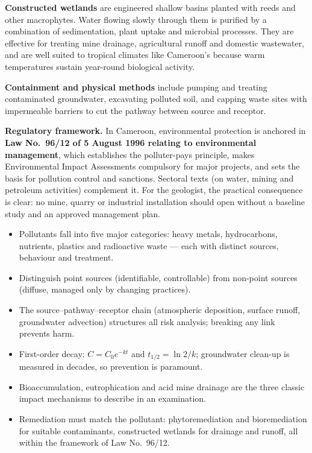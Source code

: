 \documentclass[11pt]{article}
\begin{document}
\textbf{Constructed wetlands} are engineered shallow basins planted with reeds and other macrophytes. Water flowing slowly through them is purified by a combination of sedimentation, plant uptake and microbial processes. They are effective for treating mine drainage, agricultural runoff and domestic wastewater, and are well suited to tropical climates like Cameroon's because warm temperatures sustain year-round biological activity.

\textbf{Containment and physical methods} include pumping and treating contaminated groundwater, excavating polluted soil, and capping waste sites with impermeable barriers to cut the pathway between source and receptor.

\textbf{Regulatory framework.} In Cameroon, environmental protection is anchored in \textbf{Law No.\ 96/12 of 5 August 1996 relating to environmental management}, which establishes the polluter-pays principle, makes Environmental Impact Assessments compulsory for major projects, and sets the basis for pollution control and sanctions. Sectoral texts (on water, mining and petroleum activities) complement it. For the geologist, the practical consequence is clear: no mine, quarry or industrial installation should open without a baseline study and an approved management plan.

\begin{aretenir}
\begin{itemize}
\item Pollutants fall into five major categories: heavy metals, hydrocarbons, nutrients, plastics and radioactive waste — each with distinct sources, behaviour and treatment.
\item Distinguish point sources (identifiable, controllable) from non-point sources (diffuse, managed only by changing practices).
\item The source–pathway–receptor chain (atmospheric deposition, surface runoff, groundwater advection) structures all risk analysis; breaking any link prevents harm.
\item First-order decay: $C = C_0 e^{-kt}$ and $t_{1/2} = \ln 2 / k$; groundwater clean-up is measured in decades, so prevention is paramount.
\item Bioaccumulation, eutrophication and acid mine drainage are the three classic impact mechanisms to describe in an examination.
\item Remediation must match the pollutant: phytoremediation and bioremediation for suitable contaminants, constructed wetlands for drainage and runoff, all within the framework of Law No.\ 96/12.
\end{itemize}
\end{aretenir}
\end{document}
